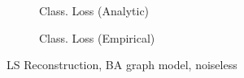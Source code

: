 \begin{figure}
\begin{subfigure}[T]{0.5\columnwidth}
    \caption{Class. Loss (Analytic)}
    \label{subsubfig:BA_noiseless_sgc_LS_class_anal}
    \end{subfigure}%
    \begin{subfigure}[T]{0.5\columnwidth}
    \caption{Class. Loss (Empirical)}%
    \label{subsubfig:BA_noiseless_sgc_LS_class_emp}
    \end{subfigure}%
    \caption{LS Reconstruction, BA graph model, noiseless}
    \vspace{-0.19cm}
\label{subfig:BA_noiseless_sgc_LS}
\end{figure}

